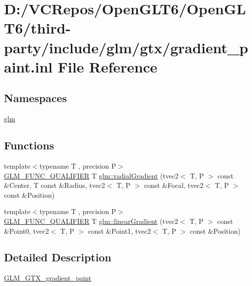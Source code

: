 \hypertarget{gradient__paint_8inl}{}\section{D\+:/\+V\+C\+Repos/\+Open\+G\+L\+T6/\+Open\+G\+L\+T6/third-\/party/include/glm/gtx/gradient\+\_\+paint.inl File Reference}
\label{gradient__paint_8inl}
\subsection*{Namespaces}
\begin{DoxyCompactItemize}
\item 
 \mbox{\hyperlink{namespaceglm}{glm}}
\end{DoxyCompactItemize}
\subsection*{Functions}
\begin{DoxyCompactItemize}
\item 
{\footnotesize template$<$typename T , precision P$>$ }\\\mbox{\hyperlink{setup_8hpp_a33fdea6f91c5f834105f7415e2a64407}{G\+L\+M\+\_\+\+F\+U\+N\+C\+\_\+\+Q\+U\+A\+L\+I\+F\+I\+ER}} T \mbox{\hyperlink{group__gtx__gradient__paint_ga166d43d567a4cf150579a92f69b0dc9f}{glm\+::radial\+Gradient}} (tvec2$<$ T, P $>$ const \&Center, T const \&Radius, tvec2$<$ T, P $>$ const \&Focal, tvec2$<$ T, P $>$ const \&Position)
\item 
{\footnotesize template$<$typename T , precision P$>$ }\\\mbox{\hyperlink{setup_8hpp_a33fdea6f91c5f834105f7415e2a64407}{G\+L\+M\+\_\+\+F\+U\+N\+C\+\_\+\+Q\+U\+A\+L\+I\+F\+I\+ER}} T \mbox{\hyperlink{group__gtx__gradient__paint_gacde26d5e0c4a1856467bded9dfad9040}{glm\+::linear\+Gradient}} (tvec2$<$ T, P $>$ const \&Point0, tvec2$<$ T, P $>$ const \&Point1, tvec2$<$ T, P $>$ const \&Position)
\end{DoxyCompactItemize}


\subsection{Detailed Description}
\mbox{\hyperlink{group__gtx__gradient__paint}{G\+L\+M\+\_\+\+G\+T\+X\+\_\+gradient\+\_\+paint}} 